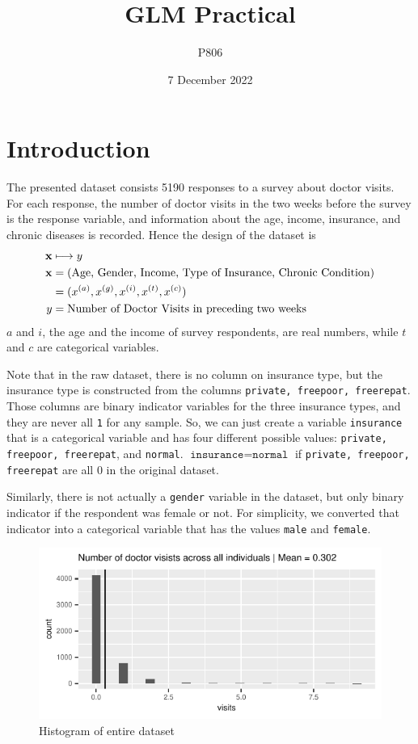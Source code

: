 \documentclass[a4paper,11pt]{article}
\title{GLM Practical}
\author{P806}
\date{7 December 2022}
\begin{document}
\newcommand{\E}{\mathrm{E}}

\newcommand{\Var}{\mathrm{Var}}

\newcommand{\Cov}{\mathrm{Cov}}

\maketitle

\section{Introduction}
The presented dataset consists 5190 responses to a survey about doctor visits. For each response, the number of doctor visits in the two weeks before the survey is the response variable, and information about the age, income, insurance, and chronic diseases is recorded. Hence the design of the dataset is
\begin{align*}
\centering
\mathbf{x}  & \longmapsto y \\
\mathbf{x} &= (\text{Age, Gender, Income, Type of Insurance, Chronic Condition}) \\
 &= (x^{(a)}, x^{(g)}, x^{(i)}, x^{(t)}, x^{(c)}) \\
y &= \text{Number of Doctor Visits in preceding two weeks}
\end{align*}
$a$ and $i$, the age and the income of survey respondents, are real numbers, while $t$ and $c$ are categorical variables.

Note that in the raw dataset, there is no column on insurance type, but the insurance type is constructed from the columns \texttt{private, freepoor, freerepat}. Those columns are binary indicator variables for the three insurance types, and they are never all \texttt{1} for any sample. So, we can just create a variable \texttt{insurance} that is a categorical variable and has four different possible values: \texttt{private, freepoor, freerepat}, and \texttt{normal}. $\texttt{insurance} = \texttt{normal}$  if \texttt{private, freepoor, freerepat} are all $0$ in the original dataset.

Similarly, there is not actually a \texttt{gender} variable in the dataset, but only binary indicator if the respondent was female or not. For simplicity, we converted that indicator into a categorical variable that has the values \texttt{male} and \texttt{female}.
\begin{figure}[h]
	\centering
	\includegraphics{../plots/histogram_of_visits.pdf}
	\caption{Histogram of entire dataset}
	\label{fig:hist_all}
\end{figure}
\end{document}
